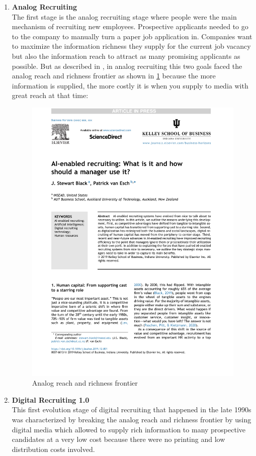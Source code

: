 \documentclass[draft,final]{thesisclass} %
\begin{document}
\begin{enumerate}
    \item \textbf{Analog Recruiting} \label{analog_recruting}\\
    The first stage is the analog recruiting stage where people were the main mechanism of recruiting new employees.
    Prospective applicants needed to go to the company to manually turn a paper job application in.
    Companies want to maximize the information richness they supply for the current job vacancy but also the information reach to attract as many promising applicants as possible.
    But as described in \cite[2]{ai_recruiting}, in analog recruiting this two goals faced the analog reach and richness frontier as shown in \ref{fig:analog_reach_richness_frontier} because the more information is supplied, the more costly it is when you supply to media with great reach at that time:
    \begin{figure}[H]
        \centering
        \includegraphics[scale=0.5,page=2,width=0.6\linewidth,trim={300 100 55 515},clip]{literature/ai_recruiting.pdf}
        \caption{Analog reach and richness frontier \cite[2]{ai_recruiting}}
        \label{fig:analog_reach_richness_frontier}
    \end{figure}
    \item \textbf{Digital Recruiting 1.0} \label{digital_recruiting_1}\\
    This first evolution stage of digital recruiting that happened in the late 1990s was characterized by breaking the analog reach and richness frontier by using digital media which allowed to supply rich information to many prospective candidates at a very low cost because there were no printing and low distribution costs involved.

\end{enumerate}
\end{document}
